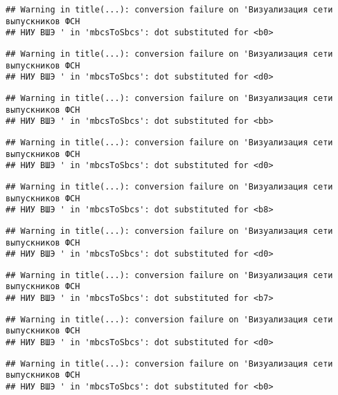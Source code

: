 \documentclass[
]{article}
\begin{document}
\begin{verbatim}
## Warning in title(...): conversion failure on 'Визуализация сети выпускников ФСН
## НИУ ВШЭ ' in 'mbcsToSbcs': dot substituted for <b0>
\end{verbatim}

\begin{verbatim}
## Warning in title(...): conversion failure on 'Визуализация сети выпускников ФСН
## НИУ ВШЭ ' in 'mbcsToSbcs': dot substituted for <d0>
\end{verbatim}

\begin{verbatim}
## Warning in title(...): conversion failure on 'Визуализация сети выпускников ФСН
## НИУ ВШЭ ' in 'mbcsToSbcs': dot substituted for <bb>
\end{verbatim}

\begin{verbatim}
## Warning in title(...): conversion failure on 'Визуализация сети выпускников ФСН
## НИУ ВШЭ ' in 'mbcsToSbcs': dot substituted for <d0>
\end{verbatim}

\begin{verbatim}
## Warning in title(...): conversion failure on 'Визуализация сети выпускников ФСН
## НИУ ВШЭ ' in 'mbcsToSbcs': dot substituted for <b8>
\end{verbatim}

\begin{verbatim}
## Warning in title(...): conversion failure on 'Визуализация сети выпускников ФСН
## НИУ ВШЭ ' in 'mbcsToSbcs': dot substituted for <d0>
\end{verbatim}

\begin{verbatim}
## Warning in title(...): conversion failure on 'Визуализация сети выпускников ФСН
## НИУ ВШЭ ' in 'mbcsToSbcs': dot substituted for <b7>
\end{verbatim}

\begin{verbatim}
## Warning in title(...): conversion failure on 'Визуализация сети выпускников ФСН
## НИУ ВШЭ ' in 'mbcsToSbcs': dot substituted for <d0>
\end{verbatim}

\begin{verbatim}
## Warning in title(...): conversion failure on 'Визуализация сети выпускников ФСН
## НИУ ВШЭ ' in 'mbcsToSbcs': dot substituted for <b0>
\end{verbatim}
\end{document}
